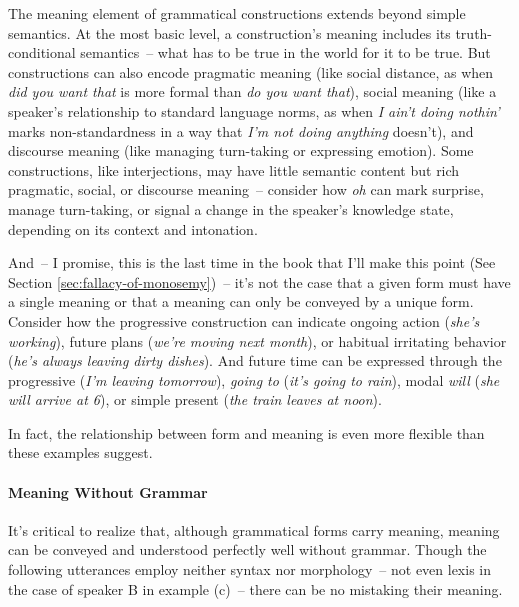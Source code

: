 The meaning element of grammatical constructions extends beyond simple semantics. At the most basic level, a construction's meaning includes its truth-conditional semantics~-- what has to be true in the world for it to be true. But constructions can also encode pragmatic meaning (like social distance, as when \textit{did you want that} is more formal than \textit{do you want that}), social meaning (like a speaker's relationship to standard language norms, as when \textit{I ain't doing nothin'} marks non-standardness in a way that \textit{I'm not doing anything} doesn't), and discourse meaning (like managing turn-taking or expressing emotion). Some constructions, like interjections, may have little semantic content but rich pragmatic, social, or discourse meaning~-- consider how \textit{oh} can mark surprise, manage turn-taking, or signal a change in the speaker's knowledge state, depending on its context and intonation.

And~-- I promise, this is the last time in the book that I'll make this point (See Section \ref{sec:fallacy-of-monosemy})~-- it's not the case that a given form must have a single meaning or that a meaning can only be conveyed by a unique form. Consider how the progressive construction can indicate ongoing action (\textit{she's working}), future plans (\textit{we're moving next month}), or habitual irritating behavior (\textit{he's always leaving dirty dishes}). And future time can be expressed through the progressive (\textit{I'm leaving tomorrow}), \textit{going to} (\textit{it's going to rain}), modal \textit{will} (\textit{she will arrive at 6}), or simple present (\textit{the train leaves at noon}).

In fact, the relationship between form and meaning is even more flexible than these examples suggest.

\paragraph*{Meaning Without Grammar}

It's critical to realize that, although grammatical forms carry meaning, meaning can be conveyed and understood perfectly well without grammar. Though the following utterances employ neither syntax nor morphology~-- not even lexis in the case of speaker B in example (c)~-- there can be no mistaking their meaning.

\ea
{}
\z\z

